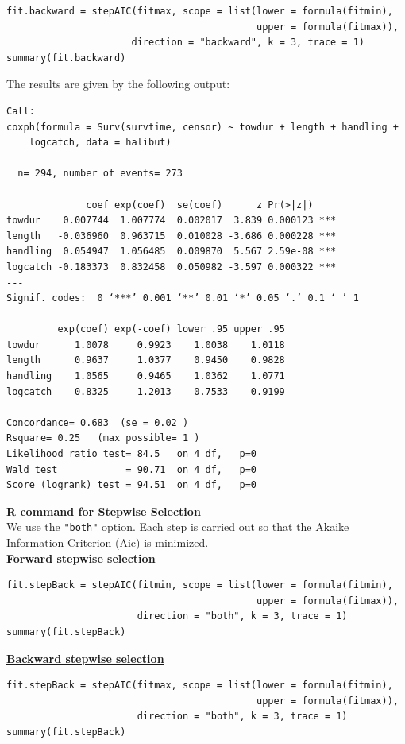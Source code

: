 \documentclass[11pt]{book}
\begin{document}
\small
\begin{verbatim}
fit.backward = stepAIC(fitmax, scope = list(lower = formula(fitmin),
                                            upper = formula(fitmax)),
                      direction = "backward", k = 3, trace = 1)
summary(fit.backward)

\end{verbatim}
\normalsize
\newpage
\noindent
The results are given by the following output:
\small
\begin{verbatim}
Call:
coxph(formula = Surv(survtime, censor) ~ towdur + length + handling +
    logcatch, data = halibut)

  n= 294, number of events= 273

              coef exp(coef)  se(coef)      z Pr(>|z|)
towdur    0.007744  1.007774  0.002017  3.839 0.000123 ***
length   -0.036960  0.963715  0.010028 -3.686 0.000228 ***
handling  0.054947  1.056485  0.009870  5.567 2.59e-08 ***
logcatch -0.183373  0.832458  0.050982 -3.597 0.000322 ***
---
Signif. codes:  0 ‘***’ 0.001 ‘**’ 0.01 ‘*’ 0.05 ‘.’ 0.1 ‘ ’ 1

         exp(coef) exp(-coef) lower .95 upper .95
towdur      1.0078     0.9923    1.0038    1.0118
length      0.9637     1.0377    0.9450    0.9828
handling    1.0565     0.9465    1.0362    1.0771
logcatch    0.8325     1.2013    0.7533    0.9199

Concordance= 0.683  (se = 0.02 )
Rsquare= 0.25   (max possible= 1 )
Likelihood ratio test= 84.5   on 4 df,   p=0
Wald test            = 90.71  on 4 df,   p=0
Score (logrank) test = 94.51  on 4 df,   p=0
\end{verbatim}
\normalsize
\underline{\bf R command for Stepwise Selection}
\\[2ex]
We use the {\tt "both"} option. Each step is carried out so that the Akaike Information Criterion (Aic) is minimized. \\[2ex]
\underline{\bf Forward stepwise selection}\\
\small
\begin{verbatim}
fit.stepBack = stepAIC(fitmin, scope = list(lower = formula(fitmin),
                                            upper = formula(fitmax)),
                       direction = "both", k = 3, trace = 1)
summary(fit.stepBack)
\end{verbatim}
\normalsize
\underline{\bf Backward stepwise selection}
\\
\small
\begin{verbatim}
fit.stepBack = stepAIC(fitmax, scope = list(lower = formula(fitmin),
                                            upper = formula(fitmax)),
                       direction = "both", k = 3, trace = 1)
summary(fit.stepBack)
\end{verbatim}
\end{document}
